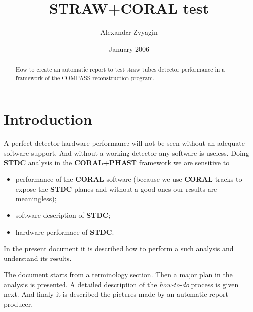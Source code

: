 \documentclass[a4paper,12pt]{article}
\author{Alexander Zvyagin}
\title{STRAW+CORAL test}
\date{January 2006}
\begin{document}
\maketitle

    \begin{abstract}
        How to create an automatic report to test straw tubes detector
        performance in a framework of the COMPASS reconstruction program.
    \end{abstract}

\tableofcontents

\section{Introduction}
A perfect detector hardware performance will not be seen without an adequate
software support. And without a working detector any software is useless.
Doing {\bf STDC} analysis in the {\bf CORAL+PHAST} framework we are sensitive
to
\begin{itemize}
\item performance of the {\bf CORAL} software (because we use {\bf CORAL}
tracks to expose the {\bf STDC} planes and without a good ones our results
are meaningless);
\item software description of {\bf STDC};
\item hardware performace of {\bf STDC}.
\end{itemize}
In the present document it is described how to perform a such analysis and
understand its results.

The document starts from a terminology section. Then a major plan in the
analysis is presented. A detailed description of the {\it how-to-do} process
is given next. And finaly it is described the pictures made by an automatic
report producer.
\end{document}
